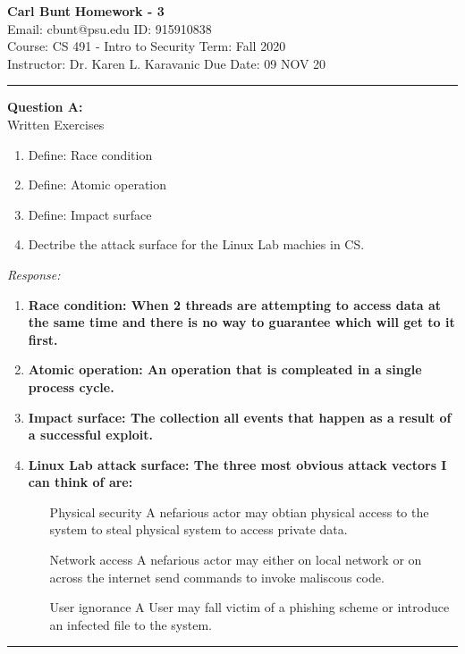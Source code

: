 \documentclass[a4paper, 11pt]{article}
\newenvironment{problem}[2][Question]
               { \begin{mdframed}[backgroundcolor=gray!20] \textbf{#1 #2:} \\}
               {   \end{mdframed}}
\newenvironment{response}
                {\textit{Response:}}
                {}
\begin{document}
 \noindent
 \large\textbf{Carl Bunt} \hfill \textbf{Homework - 3}   \\
 Email: cbunt@psu.edu \hfill ID: 915910838 \\
 \normalsize Course: CS 491 - Intro to Security \hfill Term: Fall 2020\\
 Instructor: Dr. Karen L. Karavanic \hfill Due Date: 09 NOV 20\\
 \noindent\rule{7in}{2.8pt}

 \begin{problem}{A}
   Written Exercises \\
   \begin{enumerate}[label=\arabic*.]
   \item
     Define: Race condition     
   \item
     Define: Atomic operation
   \item
     Define: Impact surface
   \item
     Dectribe the attack surface for the Linux Lab machies in CS.
   \end{enumerate}
 \end{problem}

 \begin{response}
   \begin{enumerate}[label=\arabic*.]
   \item
     \bf{Race condition}: When 2 threads are attempting to access data at the same time and there is no way to guarantee which will get to it first.
   \item
     \bf{Atomic operation}: An operation that is compleated in a single process cycle.
   \item
     \bf{Impact surface}: The collection all events that happen as a result of a successful exploit.
   \item
     \bf{Linux Lab attack surface}: The three most obvious attack vectors I can think of are:
     \begin{itemize}
     \item[Physical security]
       A nefarious actor may obtian physical access to the system to steal physical system to access private data.
     \item[Network access]
       A nefarious actor may either on local network or on across the internet send commands to invoke maliscous code.
     \item[User ignorance]
       A User may fall victim of a phishing scheme or introduce an infected file to the system.
     \end{itemize}  
   \end{enumerate}      
 \end{response}
 \noindent\rule{7in}{2.8pt}
\end{document}

